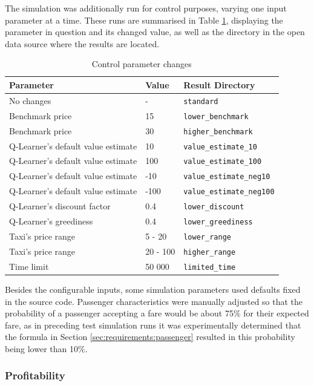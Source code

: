The simulation was additionally run for control purposes, varying one input
parameter at a time. These runs are summarised in Table
\ref{table:inputs:control}, displaying the parameter in question and its
changed value, as well as the directory in the open data source where the
results are located.

\begin{table}
\begin{tabular}{ | l | l | l | }
  \hline
  Parameter & Value & Result Directory \\ \hline
  No changes & - & \texttt{standard} \\
  Benchmark price & 15 & \texttt{lower\_benchmark} \\
  Benchmark price & 30 & \texttt{higher\_benchmark} \\
  Q-Learner's default value estimate & 10 & \texttt{value\_estimate\_10} \\
  Q-Learner's default value estimate & 100 & \texttt{value\_estimate\_100} \\
  Q-Learner's default value estimate & -10 & \texttt{value\_estimate\_neg10} \\
  Q-Learner's default value estimate & -100 & \texttt{value\_estimate\_neg100} \\
  Q-Learner's discount factor & 0.4 & \texttt{lower\_discount} \\
  Q-Learner's greediness & 0.4 & \texttt{lower\_greediness} \\
  Taxi's price range & 5 - 20 & \texttt{lower\_range} \\
  Taxi's price range & 20 - 100 & \texttt{higher\_range} \\
  Time limit & 50 000 & \texttt{limited\_time} \\
  \hline
\end{tabular}
\caption{
  Control parameter changes
  \label{table:inputs:control}
}
\end{table}

Besides the configurable inputs, some simulation parameters used defaults
fixed in the source code. Passenger characteristics were manually adjusted so
that the probability of a passenger accepting a fare would be about 75\% for
their expected fare, as in preceding test simulation runs it was experimentally
determined that the formula in Section \ref{sec:requirements:passenger}
resulted in this probability being lower than 10\%.


\subsubsection{Profitability}
\label{sec:results:profits}

